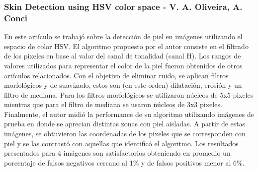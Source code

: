 	
	
	
	\subsubsection{Skin Detection using HSV color space - V. A. Oliveira, A. Conci}
	En este artículo se trabajó sobre la detección de piel en imágenes utilizando el espacio de color HSV. El algoritmo propuesto 
por el autor consiste en el filtrado de los pixeles en base al valor del canal de tonalidad (canal H). Los rangos de valores utilizados para 
representar el color de la piel fueron obtenidos de otros artículos 
relacionados. Con el objetivo de eliminar ruido, se aplican filtros morfológicos y de suavizado, estos son (en este orden) dilatación, erosión y un filtro de mediana. Para los filtros morfológicos se utilizaron núcleos de 5x5 pixeles mientras que para el filtro de mediana se usaron núcleos de 3x3 pixeles. Finalmente, el autor midió la performance de su algoritmo utilizando imágenes de prueba en donde se aprecian distintas zonas con piel aisladas. A partir de estas imágenes, se obtuvieron las coordenadas de los pixeles que se corresponden con piel y se las contrastó con aquellas que identificó el algoritmo. Los resultados presentados para 4 imágenes son satisfactorios obteniendo en promedio un porcentaje de falsos negativos cercano al 1\% y de falsos positivos menor al 6\%.

